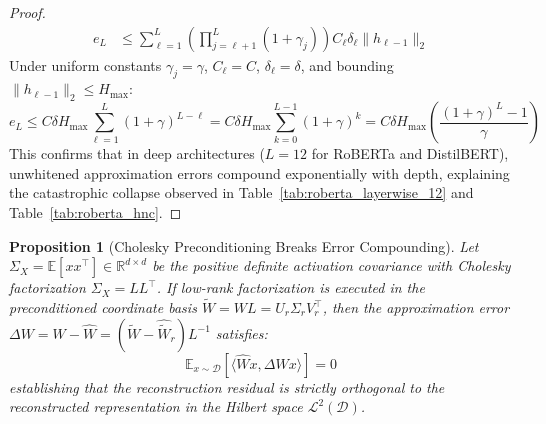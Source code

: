 \documentclass{article}
\newtheorem{proposition}{Proposition}
\begin{document}
\begin{proof}
\begin{align}
    e_L &\le \sum_{\ell=1}^L \left( \prod_{j=\ell+1}^L (1 + \gamma_j) \right) C_\ell \delta_\ell \|h_{\ell-1}\|_2
\end{align}
Under uniform constants $\gamma_j = \gamma$, $C_\ell = C$, $\delta_\ell = \delta$, and bounding $\|h_{\ell-1}\|_2 \le H_{\max}$:
\begin{equation}
    e_L \le C \delta H_{\max} \sum_{\ell=1}^L (1 + \gamma)^{L-\ell} = C \delta H_{\max} \sum_{k=0}^{L-1} (1 + \gamma)^k = C \delta H_{\max} \left( \frac{(1 + \gamma)^L - 1}{\gamma} \right)
\end{equation}
This confirms that in deep architectures ($L=12$ for RoBERTa and DistilBERT), unwhitened approximation errors compound exponentially with depth, explaining the catastrophic collapse observed in Table~\ref{tab:roberta_layerwise_12} and Table~\ref{tab:roberta_hnc}.
\end{proof}

\begin{proposition}[Cholesky Preconditioning Breaks Error Compounding]
\label{prop:cholesky_orthogonalization}
Let $\Sigma_X = \mathbb{E}[x x^\top] \in \mathbb{R}^{d \times d}$ be the positive definite activation covariance with Cholesky factorization $\Sigma_X = L L^\top$. If low-rank factorization is executed in the preconditioned coordinate basis $\tilde{W} = W L = U_r \Sigma_r V_r^\top$, then the approximation error $\Delta W = W - \hat{W} = (\tilde{W} - \hat{\tilde{W}}_r) L^{-1}$ satisfies:
\begin{equation}
    \mathbb{E}_{x \sim \mathcal{D}}\left[ \langle \hat{W} x, \Delta W x \rangle \right] = 0
\end{equation}
establishing that the reconstruction residual is strictly orthogonal to the reconstructed representation in the Hilbert space $\mathcal{L}^2(\mathcal{D})$.
\end{proposition}
\end{document}
